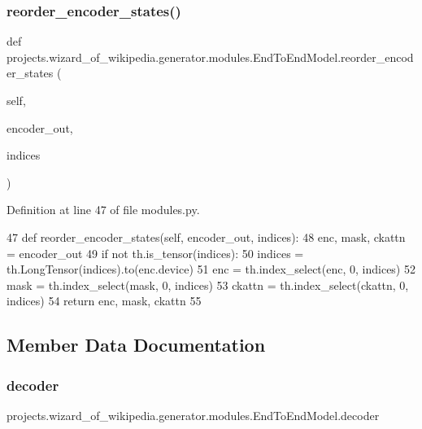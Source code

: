 \subsubsection{\texorpdfstring{reorder\+\_\+encoder\+\_\+states()}{reorder\_encoder\_states()}}
{\footnotesize\ttfamily def projects.\+wizard\+\_\+of\+\_\+wikipedia.\+generator.\+modules.\+End\+To\+End\+Model.\+reorder\+\_\+encoder\+\_\+states (\begin{DoxyParamCaption}\item[{}]{self,  }\item[{}]{encoder\+\_\+out,  }\item[{}]{indices }\end{DoxyParamCaption})}



Definition at line 47 of file modules.\+py.


\begin{DoxyCode}
47     \textcolor{keyword}{def }reorder\_encoder\_states(self, encoder\_out, indices):
48         enc, mask, ckattn = encoder\_out
49         \textcolor{keywordflow}{if} \textcolor{keywordflow}{not} th.is\_tensor(indices):
50             indices = th.LongTensor(indices).to(enc.device)
51         enc = th.index\_select(enc, 0, indices)
52         mask = th.index\_select(mask, 0, indices)
53         ckattn = th.index\_select(ckattn, 0, indices)
54         \textcolor{keywordflow}{return} enc, mask, ckattn
55 
\end{DoxyCode}


\subsection{Member Data Documentation}
\mbox{\label{classprojects_1_1wizard__of__wikipedia_1_1generator_1_1modules_1_1EndToEndModel_ab5c118e09c397fc75ccf49fb45119bd1}} 
\subsubsection{\texorpdfstring{decoder}{decoder}}
{\footnotesize\ttfamily projects.\+wizard\+\_\+of\+\_\+wikipedia.\+generator.\+modules.\+End\+To\+End\+Model.\+decoder}



